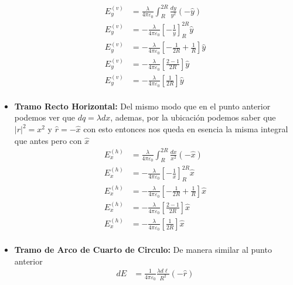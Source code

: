 \documentclass{report}
\begin{document}
\begin{itemize}
		\begin{align*}
			E_y^{\left(v\right)} &= \frac{\lambda}{4\pi\varepsilon_0}\int_R^{2R} \frac{dy}{y^2}(-\hat{y})\\
			E_y^{\left(v\right)} &= - \frac{\lambda}{4\pi\varepsilon_0} \left[-\frac{1}{y}\right]_{R}^{2R}\hat{y}\\
			E_y^{\left(v\right)} &= - \frac{\lambda}{4\pi\varepsilon_0} \left[- \frac{1}{2R} + \frac{1}{R}\right]\hat{y}\\
			E_y^{\left(v\right)} &= - \frac{\lambda}{4\pi\varepsilon_0} \left[\frac{2 - 1}{2R}\right]\hat{y}\\
			E_y^{\left(v\right)} &= - \frac{\lambda}{4\pi\varepsilon_0} \left[\frac{1}{2R}\right]\hat{y}\\
		\end{align*}
	\item \textbf{Tramo Recto Horizontal:} Del mismo modo que en el punto anterior podemos ver que 
		$dq = \lambda dx$, ademas, por la ubicación podemos saber que $\left|r\right|^2 = x^2$ y $\hat{r} = - \hat{x}$ con esto entonces nos queda en esencia la misma integral que antes pero con $\hat{x}$
		\begin{align*}
			E_x^{\left(h\right)} &= \frac{\lambda}{4\pi\varepsilon_0}\int_R^{2R} \frac{dx}{x^2}(-\hat{x})\\
			E_x^{\left(h\right)} &= - \frac{\lambda}{4\pi\varepsilon_0} \left[-\frac{1}{x}\right]_{R}^{2R}\hat{x}\\
			E_x^{\left(h\right)} &= - \frac{\lambda}{4\pi\varepsilon_0} \left[- \frac{1}{2R} + \frac{1}{R}\right]\hat{x}\\
			E_x^{\left(h\right)} &= - \frac{\lambda}{4\pi\varepsilon_0} \left[\frac{2 - 1}{2R}\right]\hat{x}\\
			E_x^{\left(h\right)} &= - \frac{\lambda}{4\pi\varepsilon_0} \left[\frac{1}{2R}\right]\hat{x}\\
		\end{align*}

	\item \textbf{Tramo de Arco de Cuarto de Circulo:} De manera similar al punto anterior
		\begin{align*}
			dE &= \frac{1}{4\pi\varepsilon_0} \frac{\lambda d\ell}{R^2} \left(-\hat{r}\right)\\
		\end{align*}


\end{itemize}
\end{document}

